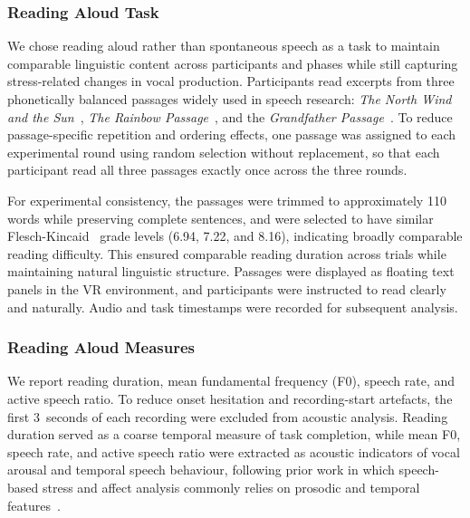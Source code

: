 
\subsubsection{Reading Aloud Task}
We chose reading aloud rather than spontaneous speech as a task to maintain comparable linguistic content across participants and phases while still capturing stress-related changes in vocal production. Participants read excerpts from three phonetically balanced passages widely used in speech research: \textit{The North Wind and the Sun}~\citep{international1999handbook}, \textit{The Rainbow Passage}~\citep{van1972speech}, and the \textit{Grandfather Passage}~\citep{fairbanks1940voice}. To reduce passage-specific repetition and ordering effects, one passage was assigned to each experimental round using random selection without replacement, so that each participant read all three passages exactly once across the three rounds.

For experimental consistency, the passages were trimmed to approximately 110 words while preserving complete sentences, and were selected to have similar Flesch-Kincaid~\citep{kincaid1975derivation} grade levels (6.94, 7.22, and 8.16), indicating broadly comparable reading difficulty. This ensured comparable reading duration across trials while maintaining natural linguistic structure. Passages were displayed as floating text panels in the VR environment, and participants were instructed to read clearly and naturally. Audio and task timestamps were recorded for subsequent analysis.

\subsubsection{Reading Aloud Measures}
We report reading duration, mean fundamental frequency (F0), speech rate, and active speech ratio. To reduce onset hesitation and recording-start artefacts, the first 3~seconds of each recording were excluded from acoustic analysis. Reading duration served as a coarse temporal measure of task completion, while mean F0, speech rate, and active speech ratio were extracted as acoustic indicators of vocal arousal and temporal speech behaviour, following prior work in which speech-based stress and affect analysis commonly relies on prosodic and temporal features~\citep{schewski2025measuring,kappen2022acoustic}.

